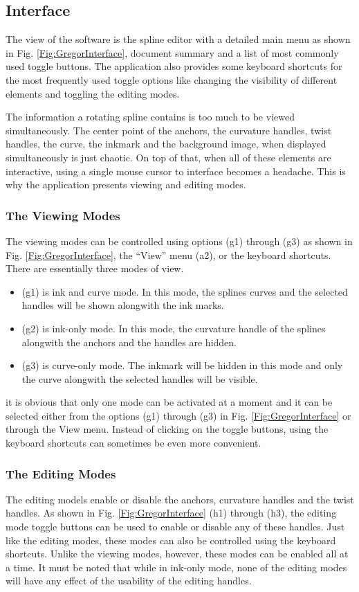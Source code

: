 \subsection{Interface}
{
    The view of the software is the spline editor with a detailed main menu as shown in Fig. \ref{Fig:GregorInterface}, document summary and a list of most commonly used toggle buttons. The application also provides some keyboard shortcuts for the most frequently used toggle options like changing the visibility of different elements and toggling the editing modes.
    
    The information a rotating spline contains is too much to be viewed simultaneously. The center point of the anchors, the curvature handles, twist handles, the curve, the inkmark and the background image, when displayed simultaneously is just chaotic. On top of that, when all of these elements are interactive, using a single mouse cursor to interface becomes a headache. This is why the application presents viewing and editing modes.
    \subsubsection{The Viewing Modes}
    {
        The viewing modes can be controlled using options (g1) through (g3) as shown in Fig.  \ref{Fig:GregorInterface}, the ``View'' menu (a2), or the keyboard shortcuts. There are essentially three modes of view. 
        \begin{itemize}
          \item (g1) is ink and curve mode. In this mode, the splines curves and the selected handles will be shown alongwith the ink marks. 
          \item (g2) is ink-only mode. In this mode, the curvature handle of the splines alongwith the anchors and the handles are hidden.
          \item (g3) is curve-only mode. The inkmark will be hidden in this mode and only the curve alongwith the selected handles will be visible.
        \end{itemize}
        it is obvious that only one mode can be activated at a moment and it can be selected either from the options (g1) through (g3) in Fig.  \ref{Fig:GregorInterface} or through the View menu. Instead of clicking on the toggle buttons, using the keyboard shortcuts can sometimes be even more convenient.
    }
    \subsubsection{The Editing Modes}
    {
        The editing models enable or disable the anchors, curvature handles and the twist handles. As shown in Fig. \ref{Fig:GregorInterface} (h1) through (h3), the editing mode toggle buttons can be used to enable or disable any of these handles. Just like the editing modes, these modes can also be controlled using the keyboard shortcuts. Unlike the viewing modes, however, these modes can be enabled all at a time. It must be noted that while in ink-only mode, none of the editing modes will have any effect of the usability of the editing handles.
    }
    
}
